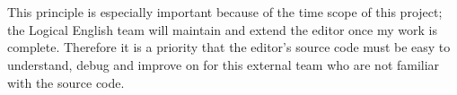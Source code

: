 \documentclass[../main.tex]{subfiles}
\begin{document}
\\
\\
This principle is especially important because of the time scope of this project; the Logical English team will maintain and extend the editor once my work is complete. Therefore it is a priority that the editor's source code must be easy to understand, debug and improve on for this external team who are not familiar with the source code.

\end{document}
